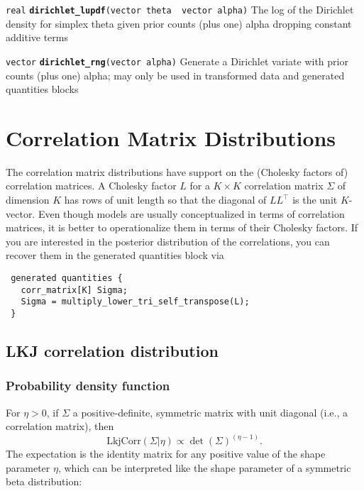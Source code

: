 \documentclass[
  10pt,
]{book}
\begin{document}
\texttt{real} \textbf{\texttt{dirichlet\_lupdf}}\texttt{(vector\ theta\ \textbar{}\ vector\ alpha)}\newline
The log of the Dirichlet density for simplex theta given prior counts
(plus one) alpha dropping constant additive terms


\texttt{vector} \textbf{\texttt{dirichlet\_rng}}\texttt{(vector\ alpha)}\newline
Generate a Dirichlet variate with prior counts (plus one) alpha; may
only be used in transformed data and generated quantities blocks

\hypertarget{correlation-matrix-distributions}{%
\chapter{Correlation Matrix Distributions}\label{correlation-matrix-distributions}}

The correlation matrix distributions have support on the (Cholesky
factors of) correlation matrices. A Cholesky factor \(L\) for a \(K \times K\) correlation matrix \(\Sigma\) of dimension \(K\) has rows of
unit length so that the diagonal of \(L L^{\top}\) is the unit
\(K\)-vector. Even though models are usually conceptualized in terms of
correlation matrices, it is better to operationalize them in terms of
their Cholesky factors. If you are interested in the posterior
distribution of the correlations, you can recover them in the
generated quantities block via

\begin{verbatim}
 generated quantities {
   corr_matrix[K] Sigma;
   Sigma = multiply_lower_tri_self_transpose(L);
 }
\end{verbatim}

\hypertarget{lkj-correlation}{%
\section{LKJ correlation distribution}\label{lkj-correlation}}

\hypertarget{probability-density-function-32}{%
\subsection{Probability density function}\label{probability-density-function-32}}

For \(\eta > 0\), if \(\Sigma\) a positive-definite, symmetric matrix with
unit diagonal (i.e., a correlation matrix), then \[
\text{LkjCorr}(\Sigma|\eta) \propto \det \left( \Sigma \right)^{(\eta
- 1)}. \] The expectation is the identity matrix for any positive
value of the shape parameter \(\eta\), which can be interpreted like the
shape parameter of a symmetric beta distribution:
\end{document}
